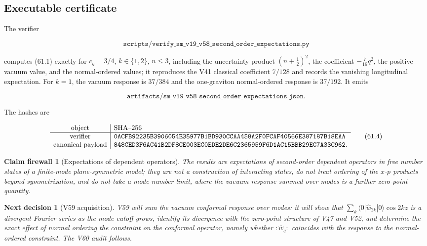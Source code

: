 \documentclass[11pt]{article}
\newtheorem{firewall}[theorem]{Claim firewall}
\newtheorem{decision}[theorem]{Next decision}
\theoremstyle{remark}
\begin{document}
\subsection{Executable certificate}

The verifier

\[
 \texttt{scripts/verify\_sm\_v19\_v58\_second\_order\_expectations.py}
                                                                    \tag{61.2}
\]

computes (61.1) exactly for \(c_g=3/4\), \(k\in\{1,2\}\), \(n\leq3\),
including the uncertainty product \((n+\tfrac12)^2\), the coefficient
\(-\tfrac7{16}q^2\), the positive vacuum value, and the normal-ordered
values; it reproduces the V41 classical coefficient \(7/128\) and
records the vanishing longitudinal expectation.  For \(k=1\), the
vacuum response is \(37/384\) and the one-graviton normal-ordered
response is \(37/192\).  It emits

\[
 \texttt{artifacts/sm\_v19\_v58\_second\_order\_expectations.json}.  \tag{61.3}
\]

The hashes are

\[
\begin{array}{c|l}
\hbox{object}&\hbox{SHA--256}\\ \hline
\hbox{verifier}&
\texttt{0ACFB92235B3906054E35977B1BD930CCAA458A2F0FCAF40566E387187B18EAA}\\
\hbox{canonical payload}&
\texttt{848CED3F6AC41B2DF8CE003EC0EDE2DE6C2365959F6D1AC15BBB29EC7A33C962}.
\end{array}                                                     \tag{61.4}
\]

\begin{firewall}[Expectations of dependent operators]
\label{fire:v19v58}
The results are expectations of second-order dependent operators in
free number states of a finite-mode plane-symmetric model; they are
not a construction of interacting states, do not treat ordering of
the \(x\)-\(p\) products beyond symmetrization, and do not take a
mode-number limit, where the vacuum response summed over modes is a
further zero-point quantity.
\end{firewall}

\begin{decision}[V59 acquisition]
\label{dec:v19v58-next}
V59 will sum the vacuum conformal response over modes: it will show
that \(\sum_k\langle0|\hat w_{2k}|0\rangle\cos2kz\) is a divergent
Fourier series as the mode cutoff grows, identify its divergence with
the zero-point structure of V47 and V52, and determine the exact effect
of normal ordering the constraint on the conformal operator, namely
whether \(:\hat w_q:\) coincides with the response to the normal-ordered
constraint.  The V60 audit follows.
\end{decision}
\end{document}
